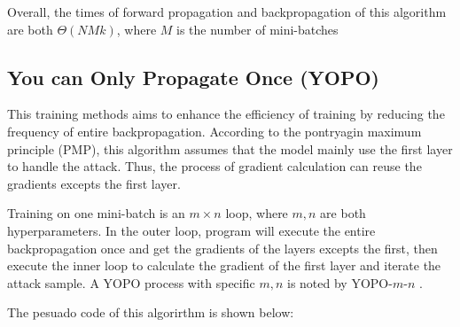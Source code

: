 \documentclass[10pt,twocolumn,letterpaper]{article}
\begin{document}
Overall, the times of forward propagation and backpropagation of this algorithm are both $\Theta (NMk)$, where $M$ is the number of mini-batches

\subsection{You can Only Propagate Once (YOPO)}

This training methods aims to enhance the efficiency of training by reducing the frequency of entire backpropagation. According to the pontryagin maximum principle (PMP), this algorithm assumes that the model mainly use the first layer to handle the attack. Thus, the process of gradient calculation can reuse the gradients excepts the first layer.

Training on one mini-batch is an $m\times n$ loop, where $m, n$ are both hyperparameters. In the outer loop, program will execute the entire backpropagation once and get the gradients of the layers excepts the first, then execute the inner loop to calculate the gradient of the first layer and iterate the attack sample. A YOPO process with specific $m, n$ is noted by YOPO-$m$-$n$ .

The pesuado code of this algorirthm is shown below:
\end{document}

